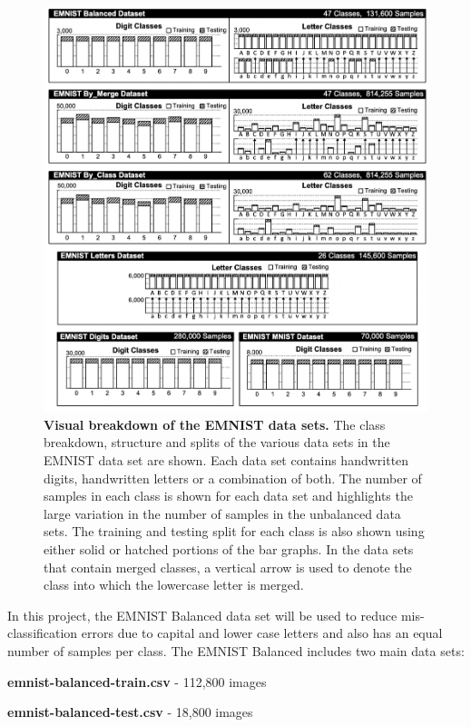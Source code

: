 \documentclass[conference]{IEEEtran}
\begin{document}
\begin{figure}[h!]
\centering
\includegraphics[width=1\linewidth]{images/emnist.jpg}
\caption{\textbf{Visual breakdown of the EMNIST data sets.} The class breakdown, structure and splits of the various data sets in the EMNIST data set are shown. Each data set contains handwritten digits, handwritten letters or a combination of both. The number of samples in each class is shown for each data set and highlights the large variation in the number of samples in the unbalanced data sets. The training and testing split for each class is also shown using either solid or hatched portions of the bar graphs. In the data sets that contain merged classes, a vertical arrow is used to denote the class into which the lowercase letter is merged.}
\label{fig:population}
\end{figure}

In this project, the EMNIST Balanced data set will be used to reduce mis-classification errors due to capital and lower case letters and also has an equal number of samples per class. The EMNIST Balanced includes two main data sets:

\begin{description}[font=$\bullet$~\normalfont\scshape\color{red!50!black}]
  \item \textbf{emnist-balanced-train.csv} - 112,800 images
  \item \textbf{emnist-balanced-test.csv} - 18,800 images
\end{description}
\end{document}
